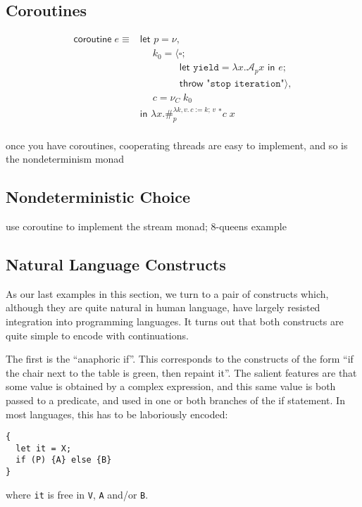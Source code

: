 \documentclass[11pt]{article}
\newcommand{\maybePage}{\newpage}
\newcommand\x{\lambda x}
\newcommand{\letin}[2]{\textsf{let }#1\textsf{ in }#2}
\newcommand\A{\mathcal{A}}
\newcommand{\angles}[1]{\langle#1\rangle}
\begin{document}
\maybePage
\subsection{Coroutines}

\begin{align*}
\textsf{coroutine}\;e \equiv{}
&\textsf{let }p = \nu, \\
  &\quad\; k_0 = \angles{
    \square; \\
    &\qquad\qquad \letin{\texttt{yield}=\x.{\A_px}}{e}; \\
    &\qquad\qquad \textsf{throw }\texttt{"stop iteration"}}, \\
  &\quad\; c = \nu_C\;k_0 \\
  &\textsf{in }
  \x.\#_p^{\lambda k,v.\,c:=k;\,v}\: ^*\!c\;x \\
\end{align*}

once you have coroutines, cooperating threads are easy to implement,
and so is the nondeterminism monad

\subsection{Nondeterministic Choice}
use coroutine to implement the stream monad; 8-queens example

\maybePage
\subsection{Natural Language Constructs}

As our last examples in this section, we turn to a pair of constructs which, although they are quite natural in human language, have largely resisted integration into programming languages.
It turns out that both constructs are quite simple to encode with continuations.

The first is the ``anaphoric if''.
This corresponds to the constructs of the form ``if the chair next to the table is green, then repaint it''.
The salient features are that some value is obtained by a complex expression, and this same value is both passed to a predicate, and used in one or both branches of the if statement.
In most languages, this has to be laboriously encoded:
\begin{verbatim}
{
  let it = X;
  if (P) {A} else {B}
}
\end{verbatim}
where \texttt{it} is free in \texttt{V}, \texttt{A} and/or \texttt{B}.
\end{document}
